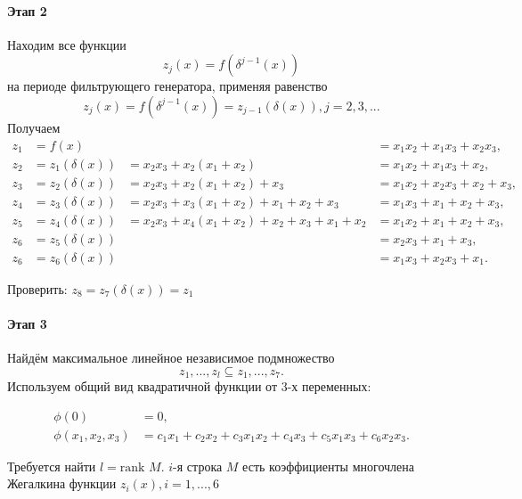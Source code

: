 \documentclass[a4paper,12pt]{article}
\newcommand{\rank}{\text{rank }}
\begin{document}
	\paragraph{Этап 2}
	Находим все функции \[ z_j(x) = f(\delta^{j-1}(x)) \] на периоде фильтрующего генератора, применяя равенство \[ z_j(x) = f(\delta^{j-1}(x)) = z_{j-1}(\delta(x)), j = 2,3,... \]
	Получаем
	$$
	\begin{aligned}
		z_1 &= f(x) & &= x_1x_2 + x_1x_3 + x_2x_3,\\
		z_2 &= z_1(\delta(x)) &= x_2x_3 + x_2(x_1 + x_2) &= x_1x_2 + x_1x_3 + x_2,\\
		z_3 &= z_2(\delta(x)) &= x_2x_3 + x_2(x_1 + x_2) + x_3 &= x_1x_2 + x_2x_3 + x_2 + x_3,\\
		z_4 &= z_3(\delta(x)) &= x_2x_3 + x_3(x_1 + x_2) + x_1 + x_2 + x_3 &= x_1x_3 + x_1 + x_2 + x_3,\\
		z_5 &= z_4(\delta(x)) &= x_2x_3 + x_4(x_1 + x_2) + x_2 + x_3 + x_1 + x_2 &= x_1x_2 + x_1 + x_2 + x_3,\\
		z_6 &= z_5(\delta(x)) & &= x_2x_3 + x_1 + x_3,\\
		z_6 &= z_6(\delta(x)) & &= x_1x_3 + x_2x_3 + x_1.
	\end{aligned}
	$$
	
	Проверить: $z_8 = z_7(\delta(x)) = z_1$
	\paragraph{Этап 3}
	Найдём максимальное линейное независимое подмножество \[ {z_1, ..., z_l} \subseteq {z_1, ..., z_7}. \]
	Используем общий вид квадратичной функции от 3-х переменных:
	
	$$
	\begin{aligned}
		\phi(0) &= 0,\\
		\phi(x_1, x_2, x_3) &= c_1x_1 + c_2x_2 + c_3x_1x_2 + c_4x_3 + c_5x_1x_3 + c_6x_2x_3.
	\end{aligned}
	$$
	
	Требуется найти $l = \rank M$. $i$-я строка $M$ есть коэффициенты многочлена Жегалкина функции $z_i(x), i = 1, ..., 6$
	
\end{document}
